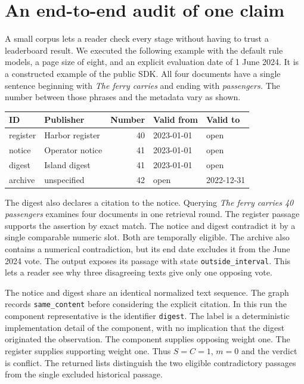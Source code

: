 \section{An end-to-end audit of one claim}
A small corpus lets a reader check every stage without having to trust a leaderboard result. We executed the following example with the default rule models, a page size of eight, and an explicit evaluation date of 1 June 2024. It is a constructed example of the public SDK. All four documents have a single sentence beginning with \emph{The ferry carries} and ending with \emph{passengers.} The number between those phrases and the metadata vary as shown.

\begin{center}\small
\begin{tabular}{@{}llrll@{}}\toprule
ID & Publisher & Number & Valid from & Valid to\\\midrule
register & Harbor register & 40 & 2023-01-01 & open\\
notice & Operator notice & 41 & 2023-01-01 & open\\
digest & Island digest & 41 & 2023-01-01 & open\\
archive & unspecified & 42 & open & 2022-12-31\\\bottomrule
\end{tabular}
\end{center}
The digest also declares a citation to the notice. Querying \emph{The ferry carries 40 passengers} examines four documents in one retrieval round. The register passage supports the assertion by exact match. The notice and digest contradict it by a single comparable numeric slot. Both are temporally eligible. The archive also contains a numerical contradiction, but its end date excludes it from the June 2024 vote. The output exposes its passage with state \texttt{outside\_interval}. This lets a reader see why three disagreeing texts give only one opposing vote.

The notice and digest share an identical normalized text sequence. The graph records \texttt{same\_content} before considering the explicit citation. In this run the component representative is the identifier \texttt{digest}. The label is a deterministic implementation detail of the component, with no implication that the digest originated the observation. The component supplies opposing weight one. The register supplies supporting weight one. Thus $S=C=1$, $m=0$ and the verdict is conflict. The returned lists distinguish the two eligible contradictory passages from the single excluded historical passage.

